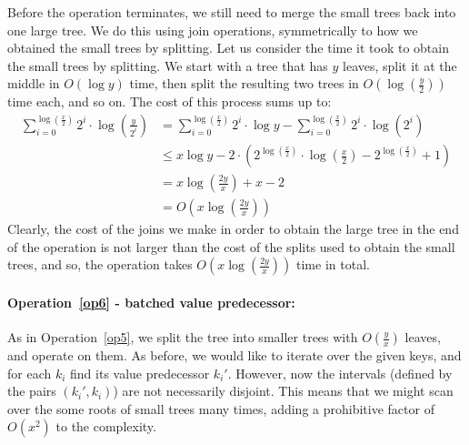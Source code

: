 \documentclass[11pt,a4paper]{article}
\theoremstyle{definition}
\theoremstyle{remark}
\begin{document}
Before the operation terminates, we still need to merge the small trees back into one large tree. We do this using join operations, symmetrically to how we obtained the small trees by splitting. Let us consider the time it took to obtain the small trees by splitting. We start with a tree that has $y$ leaves, split it at the middle  in $O(\log y)$ time, then split the resulting  two trees in $O(\log(\frac{y}{2}))$ time each, and so on. The cost of this process sums up to:
\begin{align*}
 \sum_{i=0}^{\log (\frac{x}{2})} 2^i \cdot \log (\frac{y}{2^i}) & = \sum_{i=0}^{\log (\frac{x}{2})} 2^i \cdot \log y - \sum_{i=0}^{\log (\frac{x}{2})} 2^i \cdot \log (2^i)  \\
& \leq x \log y - 2 \cdot (2^{ \log ( \frac{x}{2})} \cdot \log ( \frac{x}{2}) - 2^{ \log ( \frac{x}{2})}+1)  \\
&= x \log (\frac{2y}{x}) + x -2 \\
& = O(x \log (\frac{2y}{x})) 
\end{align*}
Clearly, the cost of the joins we make in order to obtain the large tree in the end of the operation is not larger than the cost of the splits used to obtain the small trees, and so, the operation takes $O(x \log (\frac{2y}{x}))$ time in total.

\paragraph{Operation~\ref{op6} - batched value predecessor:}
As in Operation~\ref{op5}, we split the tree into smaller trees with $O(\frac{y}{x})$ leaves, and operate on them. As before, we would like to iterate over the given keys, and for each $k_i$ find its value predecessor $k_i'$. However, now the intervals (defined by the pairs $(k_i',k_i)$) are not necessarily disjoint. This means that we might scan over the some roots of small trees many times, adding a prohibitive factor of $O(x^2)$ to the complexity. 
\end{document}
